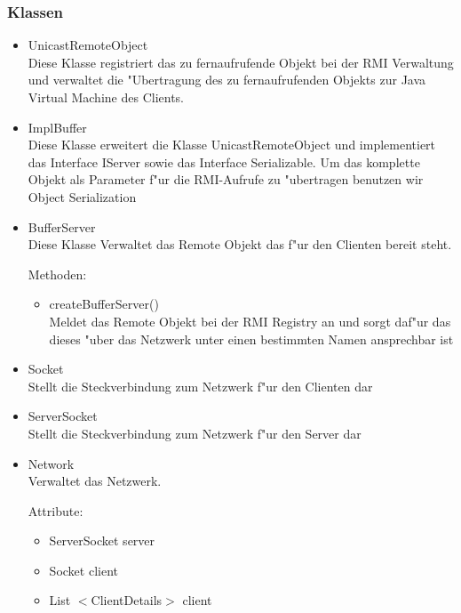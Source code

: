 \documentclass[a4paper,10pt]{article}
\begin{document}
\subsubsection{Klassen}
\begin{itemize}
\item UnicastRemoteObject \\
Diese Klasse registriert das zu fernaufrufende Objekt bei der RMI Verwaltung und verwaltet die "Ubertragung des zu fernaufrufenden Objekts zur Java Virtual Machine des Clients.
\item ImplBuffer \\
Diese Klasse erweitert die Klasse UnicastRemoteObject und implementiert das Interface IServer sowie das Interface Serializable. Um das komplette Objekt als Parameter f"ur die RMI-Aufrufe zu "ubertragen benutzen wir Object Serialization 
\item BufferServer \\
Diese Klasse Verwaltet das Remote Objekt das f"ur den Clienten bereit steht.

Methoden:
\begin{itemize}
\item createBufferServer()
\\Meldet das Remote Objekt bei der RMI Registry an und sorgt daf"ur das dieses "uber das Netzwerk unter einen bestimmten Namen ansprechbar ist
\end{itemize}

\item Socket \\
Stellt die Steckverbindung zum Netzwerk f"ur den Clienten dar
\item ServerSocket\\
Stellt die Steckverbindung zum Netzwerk f"ur den Server dar
\item Network\\
Verwaltet das Netzwerk.

Attribute:
\begin{itemize}
\item ServerSocket server
\item Socket client
\item List $<$ClientDetails$>$ client
\end{itemize}


\end{itemize}
\end{document}
